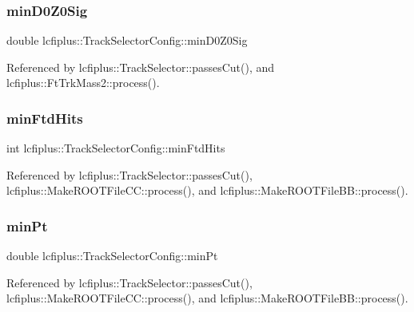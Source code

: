 \subsubsection{min\+D0\+Z0\+Sig}
{\footnotesize\ttfamily double lcfiplus\+::\+Track\+Selector\+Config\+::min\+D0\+Z0\+Sig}



Referenced by lcfiplus\+::\+Track\+Selector\+::passes\+Cut(), and lcfiplus\+::\+Ft\+Trk\+Mass2\+::process().

\mbox{\label{classlcfiplus_1_1TrackSelectorConfig_a5b50cb754fd48c457e4cb2b153f9aad4}} 
\subsubsection{min\+Ftd\+Hits}
{\footnotesize\ttfamily int lcfiplus\+::\+Track\+Selector\+Config\+::min\+Ftd\+Hits}



Referenced by lcfiplus\+::\+Track\+Selector\+::passes\+Cut(), lcfiplus\+::\+Make\+R\+O\+O\+T\+File\+C\+C\+::process(), and lcfiplus\+::\+Make\+R\+O\+O\+T\+File\+B\+B\+::process().

\mbox{\label{classlcfiplus_1_1TrackSelectorConfig_a3d2e4772eecd6700b09870860bc1d022}} 
\subsubsection{min\+Pt}
{\footnotesize\ttfamily double lcfiplus\+::\+Track\+Selector\+Config\+::min\+Pt}



Referenced by lcfiplus\+::\+Track\+Selector\+::passes\+Cut(), lcfiplus\+::\+Make\+R\+O\+O\+T\+File\+C\+C\+::process(), and lcfiplus\+::\+Make\+R\+O\+O\+T\+File\+B\+B\+::process().

\mbox{\label{classlcfiplus_1_1TrackSelectorConfig_adb1036f688d4c1db6995c01ad3fdfcc3}} 
